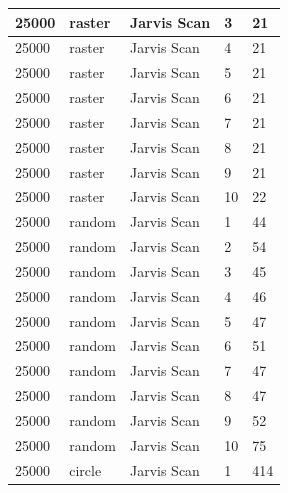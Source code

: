 \documentclass[12pt]{article}
\begin{document}
\begin{longtable}{|l|l|l|l|l|}
25000        & raster            & Jarvis Scan & 3          & 21                            \\ \hline
25000        & raster            & Jarvis Scan & 4          & 21                            \\ \hline
25000        & raster            & Jarvis Scan & 5          & 21                            \\ \hline
25000        & raster            & Jarvis Scan & 6          & 21                            \\ \hline
25000        & raster            & Jarvis Scan & 7          & 21                            \\ \hline
25000        & raster            & Jarvis Scan & 8          & 21                            \\ \hline
25000        & raster            & Jarvis Scan & 9          & 21                            \\ \hline
25000        & raster            & Jarvis Scan & 10         & 22                            \\ \hline
25000        & random            & Jarvis Scan & 1          & 44                            \\ \hline
25000        & random            & Jarvis Scan & 2          & 54                            \\ \hline
25000        & random            & Jarvis Scan & 3          & 45                            \\ \hline
25000        & random            & Jarvis Scan & 4          & 46                            \\ \hline
25000        & random            & Jarvis Scan & 5          & 47                            \\ \hline
25000        & random            & Jarvis Scan & 6          & 51                            \\ \hline
25000        & random            & Jarvis Scan & 7          & 47                            \\ \hline
25000        & random            & Jarvis Scan & 8          & 47                            \\ \hline
25000        & random            & Jarvis Scan & 9          & 52                            \\ \hline
25000        & random            & Jarvis Scan & 10         & 75                            \\ \hline
25000        & circle            & Jarvis Scan & 1          & 414                           \\ \hline

\end{longtable}
\end{document}
